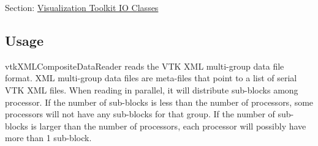 Section\-: \hyperlink{sec_vtkio}{Visualization Toolkit I\-O Classes} \hypertarget{vtkwidgets_vtkxyplotwidget_Usage}{}\subsection{Usage}\label{vtkwidgets_vtkxyplotwidget_Usage}
vtk\-X\-M\-L\-Composite\-Data\-Reader reads the V\-T\-K X\-M\-L multi-\/group data file format. X\-M\-L multi-\/group data files are meta-\/files that point to a list of serial V\-T\-K X\-M\-L files. When reading in parallel, it will distribute sub-\/blocks among processor. If the number of sub-\/blocks is less than the number of processors, some processors will not have any sub-\/blocks for that group. If the number of sub-\/blocks is larger than the number of processors, each processor will possibly have more than 1 sub-\/block.

